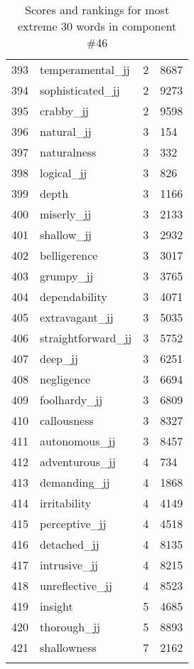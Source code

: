 \begin{longtable}[!htbp]{| rlr@{.}l |}
    393 & temperamental\_jj & 2 & 8687 \\
    394 & sophisticated\_jj & 2 & 9273 \\
    395 & crabby\_jj & 2 & 9598 \\
    396 & natural\_jj & 3 & 154 \\
    397 & naturalness & 3 & 332 \\
    398 & logical\_jj & 3 & 826 \\
    399 & depth & 3 & 1166 \\
    400 & miserly\_jj & 3 & 2133 \\
    401 & shallow\_jj & 3 & 2932 \\
    402 & belligerence & 3 & 3017 \\
    403 & grumpy\_jj & 3 & 3765 \\
    404 & dependability & 3 & 4071 \\
    405 & extravagant\_jj & 3 & 5035 \\
    406 & straightforward\_jj & 3 & 5752 \\
    407 & deep\_jj & 3 & 6251 \\
    408 & negligence & 3 & 6694 \\
    409 & foolhardy\_jj & 3 & 6809 \\
    410 & callousness & 3 & 8327 \\
    411 & autonomous\_jj & 3 & 8457 \\
    412 & adventurous\_jj & 4 & 734 \\
    413 & demanding\_jj & 4 & 1868 \\
    414 & irritability & 4 & 4149 \\
    415 & perceptive\_jj & 4 & 4518 \\
    416 & detached\_jj & 4 & 8135 \\
    417 & intrusive\_jj & 4 & 8215 \\
    418 & unreflective\_jj & 4 & 8523 \\
    419 & insight & 5 & 4685 \\
    420 & thorough\_jj & 5 & 8893 \\
    421 & shallowness & 7 & 2162 \\
    \hline
    \caption{Scores and rankings for most extreme 30 words in component \#46} \\
\end{longtable}
